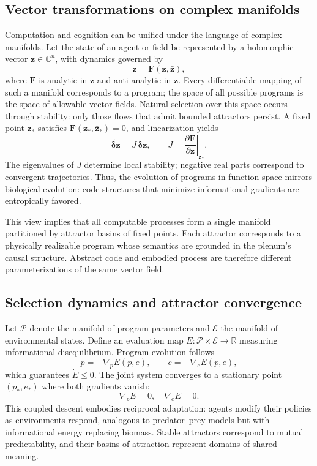 \documentclass[12pt,a4paper]{article}
\theoremstyle{plain}
\begin{document}
\subsection{Vector transformations on complex manifolds}
Computation and cognition can be unified under the language of complex manifolds.  
Let the state of an agent or field be represented by a holomorphic vector \(\mathbf{z}\in\mathbb{C}^n\),
with dynamics governed by
\[
\dot{\mathbf{z}} = \mathbf{F}(\mathbf{z},\bar{\mathbf{z}}),
\]
where \(\mathbf{F}\) is analytic in \(\mathbf{z}\) and anti-analytic in \(\bar{\mathbf{z}}\).
Every differentiable mapping of such a manifold corresponds to a program; the space of all possible programs is the space of allowable vector fields.
Natural selection over this space occurs through stability: only those flows that admit bounded attractors persist.
A fixed point \(\mathbf{z}_*\) satisfies
\(\mathbf{F}(\mathbf{z}_*,\bar{\mathbf{z}}_*)=0\),
and linearization yields
\[
\dot{\mathbf{\delta z}} = J\,\mathbf{\delta z}, \qquad 
J = \left.\frac{\partial \mathbf{F}}{\partial \mathbf{z}}\right|_{\mathbf{z}_*}.
\]
The eigenvalues of \(J\) determine local stability; 
negative real parts correspond to convergent trajectories.
Thus, the evolution of programs in function space mirrors biological evolution: 
code structures that minimize informational gradients are entropically favored.

This view implies that all computable processes form a single manifold partitioned by attractor basins of fixed points.
Each attractor corresponds to a physically realizable program whose semantics are grounded in the plenum’s causal structure.
Abstract code and embodied process are therefore different parameterizations of the same vector field.

\subsection{Selection dynamics and attractor convergence}
Let \(\mathcal{P}\) denote the manifold of program parameters and 
\(\mathcal{E}\) the manifold of environmental states.
Define an evaluation map 
\(E:\mathcal{P}\times\mathcal{E}\to\mathbb{R}\)
measuring informational disequilibrium.
Program evolution follows
\[
\dot{p} = -\nabla_p E(p,e),
\qquad
\dot{e} = -\nabla_e E(p,e),
\]
which guarantees \(\dot{E}\le0\).
The joint system converges to a stationary point \((p_*,e_*)\) where both gradients vanish:
\[
\nabla_p E = 0, \quad \nabla_e E = 0.
\]
This coupled descent embodies reciprocal adaptation:
agents modify their policies as environments respond,
analogous to predator–prey models but with informational energy replacing biomass.
Stable attractors correspond to mutual predictability,
and their basins of attraction represent domains of shared meaning.
\end{document}
